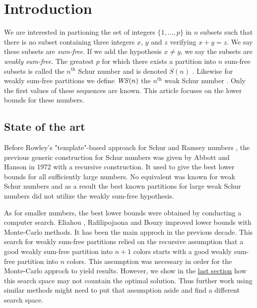\section{Introduction}

\qquad We are interested in partioning the set of integers \(\{1, ..., p\}\) in \(n\) subsets such that there is no 
subset containing three integers \(x\), \(y\) and \(z\) verifying \(x + y = z\). We say these subsets are 
\textit{sum-free}. If we add the hypothesis \(x \neq y\), we say the subsets are \textit{weakly sum-free}. The 
greatest \(p\) for which there exists a partition into \(n\) sum-free subsets is called the \(n^{\text{th}}\) Schur 
number and is denoted \(S(n)\) \cite{Schur1917}. Likewise for weakly sum-free partitions we define \(\mathit{WS}(n)\) 
the \(n^{\text{th}}\) weak Schur number \cite{Irving1973}. Only the first values of these sequences are known. 
This article focuses on the lower bounds for these numbers.


\subsection{State of the art}

\qquad Before Rowley's "template"-based approach for Schur and Ramsey numbers \cite{RowleyRamsey}, the 
previous generic construction for Schur numbers was given by Abbott and Hanson \cite{AbbottHanson} in 1972 
with a recursive construction. It used to give the best lower bounds for all sufficiently large numbers. No equivalent 
was known for weak Schur numbers and as a result the best known partitions for large weak Schur numbers 
did not utilize the weakly sum-free hypothesis. 

\par
As for smaller numbers, the best lower bounds were obtained by conducting a computer search. Eliahou \cite{ELIAHOU2012175}, 
Rafilipojaona \cite{Rafilipojaona} and Bouzy \cite{Bouzy2015AnAP} improved lower bounds with Monte-Carlo methods. It 
has been the main approch in the previous decade. 
This search for weakly sum-free partitions relied on the recursive assumption that a good weakly sum-free partition into \(n+1\) 
colors starts with a good weakly sum-free partition into \(n\) colors. This assumption was necessary in order for the Monte-Carlo
approch to yield results. However, we show in the \hyperlink{sat}{last section} how this search space may not countain
the optimal solution. Thus further work using similar methods might need to put that assumption aside and 
find a different search space.

